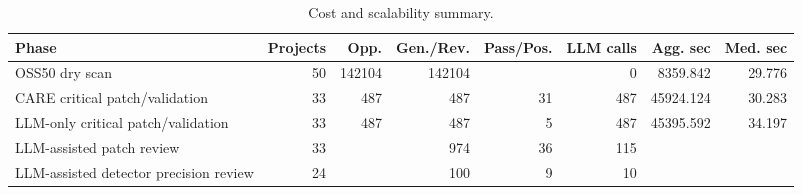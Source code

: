 \begin{table}[t]
    \centering
    \caption{Cost and scalability summary.}
    \label{tab:cost-scalability}
    \begin{tabular}{lrrrrrrr}
        \toprule
        Phase & Projects & Opp. & Gen./Rev. & Pass/Pos. & LLM calls & Agg. sec & Med. sec \\
        \midrule
        OSS50 dry scan & 50 & 142104 & 142104 &  & 0 & 8359.842 & 29.776 \\
        CARE critical patch/validation & 33 & 487 & 487 & 31 & 487 & 45924.124 & 30.283 \\
        LLM-only critical patch/validation & 33 & 487 & 487 & 5 & 487 & 45395.592 & 34.197 \\
        LLM-assisted patch review & 33 &  & 974 & 36 & 115 &  &  \\
        LLM-assisted detector precision review & 24 &  & 100 & 9 & 10 &  &  \\
        \bottomrule
    \end{tabular}
\end{table}
